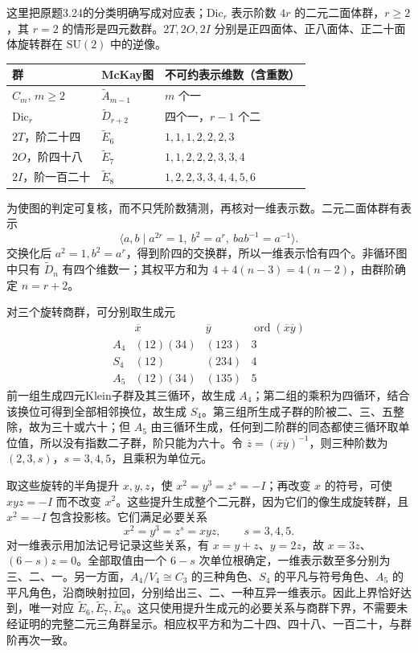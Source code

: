 \begin{solution}
这里把原题3.24的分类明确写成对应表；$\mathrm{Dic}_r$ 表示阶数 $4r$ 的二元二面体群，$r\ge2$，其 $r=2$ 的情形是四元数群。$2T,2O,2I$ 分别是正四面体、正八面体、正二十面体旋转群在 $\mathrm{SU}(2)$ 中的逆像。
\begin{center}\small
\begin{tabular}{lll}
\toprule
群 & McKay图 & 不可约表示维数（含重数）\\
\midrule
$C_m$, $m\ge2$ & $\widetilde A_{m-1}$ & $m$ 个一\\
$\mathrm{Dic}_r$ & $\widetilde D_{r+2}$ & 四个一，$r-1$ 个二\\
$2T$，阶二十四 & $\widetilde E_6$ & $1,1,1,2,2,2,3$\\
$2O$，阶四十八 & $\widetilde E_7$ & $1,1,2,2,2,3,3,4$\\
$2I$，阶一百二十 & $\widetilde E_8$ & $1,2,2,3,3,4,4,5,6$\\
\bottomrule
\end{tabular}\end{center}
为使图的判定可复核，而不只凭阶数猜测，再核对一维表示数。二元二面体群有表示
\[
 \langle a,b\mid a^{2r}=1,\ b^2=a^r,\ bab^{-1}=a^{-1}\rangle.
\]
交换化后 $a^2=1,b^2=a^r$，得到阶四的交换群，所以一维表示恰有四个。非循环图中只有 $\widetilde D_n$ 有四个维数一；其权平方和为 $4+4(n-3)=4(n-2)$，由群阶确定 $n=r+2$。

对三个旋转商群，可分别取生成元
\[
\begin{array}{c|cc|c}
 &\overline x&\overline y&\operatorname{ord}(\overline x\overline y)\\\hline
 A_4&(12)(34)&(123)&3\\
 S_4&(12)&(234)&4\\
 A_5&(12)(34)&(135)&5
\end{array}
\]
前一组生成四元Klein子群及其三循环，故生成 $A_4$；第二组的乘积为四循环，结合该换位可得到全部相邻换位，故生成 $S_4$。第三组所生成子群的阶被二、三、五整除，故为三十或六十；但 $A_5$ 由三循环生成，任何到二阶群的同态都使三循环取单位值，所以没有指数二子群，阶只能为六十。令 $\overline z=(\overline x\overline y)^{-1}$，则三种阶数为 $(2,3,s)$，$s=3,4,5$，且乘积为单位元。

取这些旋转的半角提升 $x,y,z$，使 $x^2=y^3=z^s=-I$；再改变 $x$ 的符号，可使 $xyz=-I$ 而不改变 $x^2$。这些提升生成整个二元群，因为它们的像生成旋转群，且 $x^2=-I$ 包含投影核。它们满足必要关系
\[
 x^2=y^3=z^s=xyz,\qquad s=3,4,5.
\]
对一维表示用加法记号记录这些关系，有 $x=y+z$、$y=2z$，故 $x=3z$、$(6-s)z=0$。全部取值由一个 $6-s$ 次单位根确定，一维表示数至多分别为三、二、一。另一方面，$A_4/V_4\cong C_3$ 的三种角色、$S_4$ 的平凡与符号角色、$A_5$ 的平凡角色，沿商映射拉回，分别给出三、二、一种互异一维表示。因此上界恰好达到，唯一对应 $\widetilde E_6,\widetilde E_7,\widetilde E_8$。这只使用提升生成元的必要关系与商群下界，不需要未经证明的完整二元三角群呈示。相应权平方和为二十四、四十八、一百二十，与群阶再次一致。


\end{solution}
